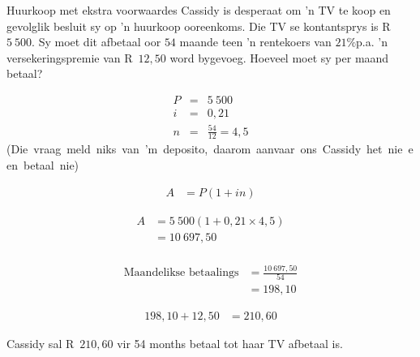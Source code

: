 \begin{wex}{Huurkoop met ekstra voorwaardes}{
    Cassidy is desperaat om 'n TV te koop en gevolglik besluit sy op 'n huurkoop ooreenkoms. Die TV se kontantsprys is R~$5~500$. Sy moet dit afbetaal oor $54$ maande teen 'n rentekoers van $21\%$p.a. 'n versekeringspremie van R~$12,50$ word bygevoeg. Hoeveel moet sy per maand betaal?}{

    \begin{eqnarray*}
	P &=& 5~500\\
	i &=& 0,21\\
	n &=& \frac{54}{12} = 4,5
    \end{eqnarray*}
    \mbox{(Die vraag meld niks van 'm deposito, daarom aanvaar ons Cassidy het nie een betaal nie)}

    \begin{align*}
	    A &= P(1 + in)
    \end{align*}

    \begin{align*}
	A &= 5~500(1 + 0,21 \times 4,5)\\
	  &= 10~697,50\\
    \end{align*}

    \begin{align*}
	\mbox{Maandelikse betaalings} &= \frac{10~697,50}{54}\\
			&= 198,10
    \end{align*}

    \begin{align*}
	198,10 + 12,50 &= 210,60
    \end{align*}

    Cassidy sal R~$210,60$ vir 54 months betaal tot haar TV afbetaal is.
}
\end{wex}


